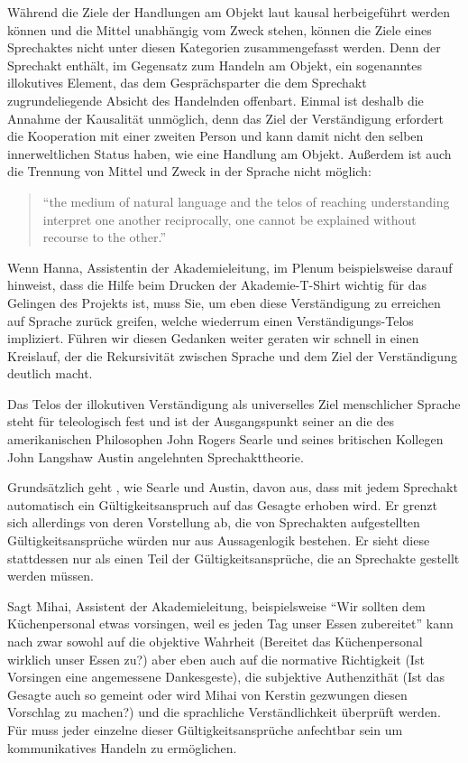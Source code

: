 {Während die Ziele der Handlungen am Objekt laut \citeauthor{Habermas-1998-aa} kausal herbeigeführt werden können und die Mittel unabhängig vom Zweck stehen, können die Ziele eines Sprechaktes nicht unter diesen Kategorien zusammengefasst werden.
Denn der Sprechakt enthält, im Gegensatz zum Handeln am Objekt, ein sogenanntes illokutives Element, das dem Gesprächsparter die dem Sprechakt zugrundeliegende Absicht des Handelnden offenbart.
Einmal ist deshalb die Annahme der Kausalität unmöglich, denn das Ziel der Verständigung erfordert die Kooperation mit einer zweiten Person und kann damit nicht den selben innerweltlichen Status haben, wie eine Handlung am Objekt.
Außerdem ist auch die Trennung von Mittel und Zweck in der Sprache nicht möglich:

	\begin{quote}
		``the medium of natural language and the telos of reaching understanding interpret one another reciprocally, one cannot be explained without recourse to the other.''
			\citep[218]{Habermas-1998-aa}
	\end{quote}

Wenn Hanna, Assistentin der Akademieleitung, im Plenum beispielsweise darauf hinweist, dass die Hilfe beim Drucken der Akademie-T-Shirt wichtig für das Gelingen des Projekts ist, muss Sie, um eben diese Verständigung zu erreichen auf Sprache zurück greifen, welche wiederrum einen Verständigungs-Telos impliziert.
Führen wir diesen Gedanken weiter geraten wir schnell in einen Kreislauf, der die Rekursivität zwischen Sprache und dem Ziel der Verständigung deutlich macht.

Das Telos der illokutiven Verständigung als universelles Ziel menschlicher Sprache steht für \citeauthor{Habermas-1998-aa} teleologisch fest und ist der Ausgangspunkt seiner an die des amerikanischen Philosophen John Rogers Searle und seines britischen Kollegen John Langshaw Austin angelehnten Sprechakttheorie.

Grundsätzlich geht \citeauthor{Habermas-1998-aa}, wie Searle und Austin, davon aus, dass mit jedem Sprechakt automatisch ein Gültigkeitsanspruch auf das Gesagte erhoben wird.
Er grenzt sich allerdings von deren Vorstellung ab, die von Sprechakten aufgestellten Gültigkeitsansprüche würden nur aus Aussagenlogik bestehen.
Er sieht diese stattdessen nur als einen Teil der Gültigkeitsansprüche, die an Sprechakte gestellt werden müssen.

Sagt Mihai, Assistent der Akademieleitung, beispielsweise ``Wir sollten dem Küchenpersonal etwas vorsingen, weil es jeden Tag unser Essen zubereitet'' kann nach \citeauthor{Habermas-1998-aa} zwar sowohl auf die objektive Wahrheit (Bereitet das Küchenpersonal wirklich unser Essen zu?) aber eben auch auf die normative Richtigkeit (Ist Vorsingen eine angemessene Dankesgeste), die subjektive Authenzithät (Ist das Gesagte auch so gemeint oder wird Mihai von Kerstin gezwungen diesen Vorschlag zu machen?) und die sprachliche Verständlichkeit überprüft werden.
Für \citeauthor{Habermas-1998-aa} muss jeder einzelne dieser Gültigkeitsansprüche anfechtbar sein um kommunikatives Handeln zu ermöglichen.

}
